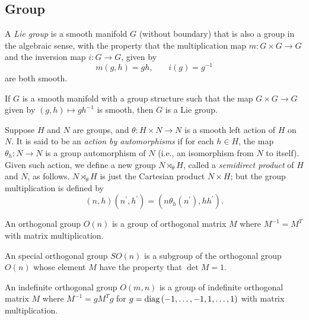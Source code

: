 \documentclass[../main.tex]{subfiles}
\begin{document}
\subsection{Group}
\begin{definition}\label{Group:Lie}
A \textit{Lie group} is a smooth manifold \(G\) (without boundary)
that is also a group in the algebraic sense,
with the property that
the multiplication map \(m\colon G\times G\to G\)
and the inversion map \(i\colon G\to G\), given by
\[
m\left(g,h\right)=gh\text{,}
\quad\quad
i\left(g\right)=g^{-1}
\]
are both smooth.
\end{definition}
\begin{proposition}\label{Group:Lie:Assertion}
If \(G\) is a smooth manifold with a group structure such that the map \(G\times G\to G\) given by \(\left(g,h\right)\mapsto gh^{-1}\) is smooth, then \(G\) is a Lie group.
\end{proposition}
\begin{definition}\label{Group:SemidirectProduct}
Suppose \(H\) and \(N\) are groups,
and \(\theta\colon H\times N\to N\) is a smooth left action of \(H\) on \(N\).
It is said to be an \textit{action by automorphisms}
if for each \(h\in H\), the map \(\theta_h\colon N\to N\) is a group automorphism of \(N\) (i.e., an isomorphism from \(N\) to itself).
Given such action, we define a new group \(N\rtimes_\theta H\),
called a \textit{semidirect product} of \(H\) and \(N\), as follows.
\(N\rtimes_\theta H\) is just the Cartesian product \(N\times H\);
but the group multiplication is defined by
\[\left(n,h\right)\left(n^\prime,h^\prime\right)=\left(n\theta_h\left(n^\prime\right),hh^\prime\right)\text{.}\]
\end{definition}
\begin{definition}\label{OrthogonalGroup}
An orthogonal group \(O\left(n\right)\) is a group of orthogonal matrix \(M\) where \(M^{-1}=M^T\) with matrix multiplication.
\end{definition}
\begin{definition}\label{SpecialOrthogonalGroup}
An special orthogonal group \(SO\left(n\right)\) is a subgroup of the orthogonal group \(O\left(n\right)\) whose element \(M\) have the property that \(\det{M}=1\).
\end{definition}
\begin{definition}\label{IndefiniteOrthogonalGroup}
An indefinite orthogonal group \(O\left(m,n\right)\) is a group of indefinite orthogonal matrix \(M\) where \(M^{-1}=gM^Tg\) for \(g=\operatorname{diag}{\left(-1,\dots,-1,1,\dots,1\right)}\) with matrix multiplication.
\end{definition}
\end{document}
